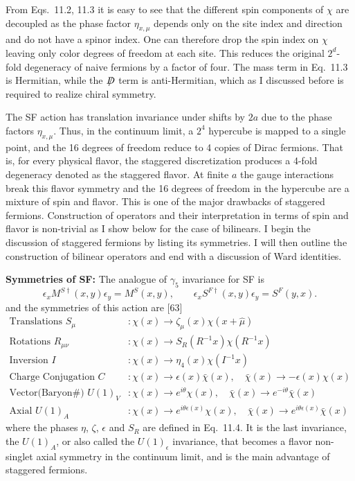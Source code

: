 From Eqs.~11.2, 11.3 it is easy to see that the different spin components of
$\chi$ are decoupled as the phase factor $\eta_{x,\mu}$ depends only on the site index and
direction and do not have a spinor index. One can therefore drop the spin
index on $\chi$ leaving only color degrees of freedom at each site. This reduces
the original $2^d$-fold degeneracy of naive fermions by a factor of four. The
mass term in Eq.~11.3 is Hermitian, while the $\slashed{D}$ term is anti-Hermitian,
which as I discussed before is required to realize chiral symmetry.

The SF action has translation invariance under shifts by $2a$ due to the
phase factors $\eta_{x,\mu}$. Thus, in the continuum limit, a $2^4$ hypercube is mapped
to a single point, and the 16 degrees of freedom reduce to 4 copies of Dirac
fermions. That is, for every physical flavor, the staggered discretization
produces a 4-fold degeneracy denoted as the staggered flavor. At finite $a$
the gauge interactions break this flavor symmetry and the 16 degrees of
freedom in the hypercube are a mixture of spin and flavor. This is one
of the major drawbacks of staggered fermions. Construction of operators
and their interpretation in terms of spin and flavor is non-trivial as I show
below for the case of bilinears. I begin the discussion of staggered fermions
by listing its symmetries. I will then outline the construction of bilinear
operators and end with a discussion of Ward identities.

\textbf{Symmetries of SF:} The analogue of $\gamma_5$ invariance for SF is
\begin{equation}
\epsilon_x M^{S\dagger}(x,y)\epsilon_y = M^S(x,y),
\qquad \epsilon_x S^{F\dagger}(x,y)\epsilon_y = S^F(y,x) .
\label{eq:sf-gamma5-analog}
\end{equation}
and the symmetries of this action are [63]
\begin{align*}
\text{Translations } S_\mu &: \chi(x) \to \zeta_\mu(x)\chi(x+\hat{\mu}) \\
\text{Rotations } R_{\mu\nu} &: \chi(x) \to S_R(R^{-1}x)\chi(R^{-1}x) \\
\text{Inversion } I &: \chi(x) \to \eta_4(x)\chi(I^{-1}x) \\
\text{Charge Conjugation } C &: \chi(x) \to \epsilon(x)\bar{\chi}(x),
\quad \bar{\chi}(x) \to -\epsilon(x)\chi(x) \\
\text{Vector(Baryon\#) } U(1)_V &: \chi(x) \to e^{i\theta}\chi(x),
\quad \bar{\chi}(x) \to e^{-i\theta}\bar{\chi}(x) \\
\text{Axial } U(1)_A &: \chi(x) \to e^{i\theta\epsilon(x)}\chi(x),
\quad \bar{\chi}(x) \to e^{i\theta\epsilon(x)}\bar{\chi}(x)
\end{align*}
where the phases $\eta$, $\zeta$, $\epsilon$ and $S_R$ are defined in Eq.~11.4. It is the last
invariance, the $U(1)_A$, or also called the $U(1)_\epsilon$ invariance, that becomes a
flavor non-singlet axial symmetry in the continuum limit, and is the main
advantage of staggered fermions.

